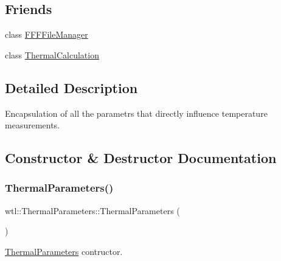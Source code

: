 \subsection*{Friends}
\begin{DoxyCompactItemize}
\item 
class \hyperlink{structwtl_1_1_thermal_parameters_a89f52b56f7155da8da3c26ad5feb1bcc}{F\+F\+F\+File\+Manager}
\item 
class \hyperlink{structwtl_1_1_thermal_parameters_a8172a5a280dab081475c7d9f2490442c}{Thermal\+Calculation}
\end{DoxyCompactItemize}


\subsection{Detailed Description}
Encapsulation of all the parametrs that directly influence temperature measurements. 

\subsection{Constructor \& Destructor Documentation}
\mbox{\label{structwtl_1_1_thermal_parameters_af0b6832e344389a25396b50ac11dac21}} 
\subsubsection{\texorpdfstring{Thermal\+Parameters()}{ThermalParameters()}\hspace{0.1cm}{\footnotesize\ttfamily [1/2]}}
{\footnotesize\ttfamily wtl\+::\+Thermal\+Parameters\+::\+Thermal\+Parameters (\begin{DoxyParamCaption}{ }\end{DoxyParamCaption})}



\hyperlink{structwtl_1_1_thermal_parameters}{Thermal\+Parameters} contructor. 

\mbox{\label{structwtl_1_1_thermal_parameters_a38c0ade2f399259ba8f53efb15decae2}} 
